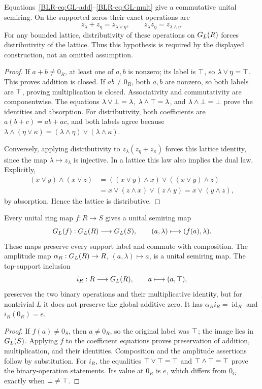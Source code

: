 \begin{theorem}\label{BLR-thm:semiring}
Equations~\eqref{BLR-eq:GL-add}--\eqref{BLR-eq:GL-mult} give a commutative
unital semiring. On the supported zeros their exact operations are
\[
 z_\lambda+z_\eta=z_{\lambda\vee\eta},\qquad
 z_\lambda z_\eta=z_{\lambda\wedge\eta}.
\]
For any bounded lattice, distributivity of these operations on $G_L(R)$
forces distributivity of the lattice. Thus this hypothesis is required
by the displayed construction, not an omitted assumption.
\end{theorem}
\begin{proof}
If $a+b\ne0_R$, at least one of $a,b$ is nonzero; its label is $\top$,
so $\lambda\vee\eta=\top$. This proves addition is closed. If
$ab\ne0_R$, both $a,b$ are nonzero, so both labels are $\top$, proving
multiplication is closed. Associativity and commutativity are componentwise.
The equations $\lambda\vee\bot=\lambda$,
$\lambda\wedge\top=\lambda$, and
$\lambda\wedge\bot=\bot$ prove the identities and absorption.
For distributivity, both coefficients are $a(b+c)=ab+ac$, and both
labels agree because
$\lambda\wedge(\eta\vee\kappa)
=(\lambda\wedge\eta)\vee(\lambda\wedge\kappa)$.

Conversely, applying distributivity to
$z_\lambda(z_\eta+z_\kappa)$ forces this lattice identity, since the
map $\lambda\mapsto z_\lambda$ is injective. In a lattice this law also
implies the dual law. Explicitly,
\begin{align*}
 (x\vee y)\wedge(x\vee z)
 &=((x\vee y)\wedge x)\vee((x\vee y)\wedge z)\\
 &=x\vee(z\wedge x)\vee(z\wedge y)
 =x\vee(y\wedge z),
\end{align*}
by absorption. Hence the lattice is distributive.
\end{proof}

\begin{proposition}\label{BLR-prop:functor}
Every unital ring map $f:R\to S$ gives a unital semiring map
\[
 G_L(f):G_L(R)\longrightarrow G_L(S),\qquad
 (a,\lambda)\longmapsto(f(a),\lambda).
\]
These maps preserve every support label and commute with composition.
The amplitude map $\alpha_R:G_L(R)\to R$, $(a,\lambda)\mapsto a$, is
a unital semiring map. The top-support inclusion
\[
 i_R:R\longrightarrow G_L(R),\qquad a\longmapsto(a,\top),
\]
preserves the two binary operations and their multiplicative identity,
but for nontrivial $L$ it does not preserve the global additive zero.
It has $\alpha_Ri_R=\operatorname{id}_R$ and $i_R(0_R)=e$.
\end{proposition}
\begin{proof}
If $f(a)\ne0_S$, then $a\ne0_R$, so the original label was $\top$;
the image lies in $G_L(S)$. Applying $f$ to the coefficient equations
proves preservation of addition, multiplication, and their identities.
Composition and the amplitude assertions follow by substitution.
For $i_R$, the equalities $\top\vee\top=\top$ and
$\top\wedge\top=\top$ prove the binary-operation statements. Its
value at $0_R$ is $e$, which differs from $0_G$ exactly when
$\bot\ne\top$.
\end{proof}

